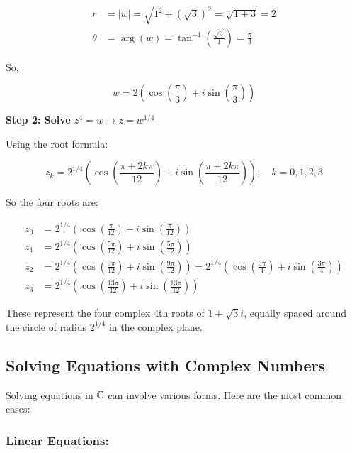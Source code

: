 \begin{align*}
	r      & = |w| = \sqrt{1^2 + {(\sqrt{3})}^2} = \sqrt{1 + 3} = 2                    \\
	\theta & = \arg(w) = \tan^{-1} \left( \frac{\sqrt{3}}{1} \right) = \frac{\pi}{3}
\end{align*}

So,

\[
	w = 2 \left( \cos\left( \frac{\pi}{3} \right) + i \sin\left( \frac{\pi}{3} \right) \right)
\]

\textbf{Step 2: Solve \( z^4 = w \to z = w^{1/4} \)}

Using the root formula:

\[
	z_k = 2^{1/4} \left( \cos\left( \frac{\pi + 2k\pi}{12} \right) + i \sin\left( \frac{\pi + 2k\pi}{12} 
	\right) \right), \quad k = 0, 1, 2, 3
\]

So the four roots are:

\begin{align*}
	z_0 & = 2^{1/4} \left( \cos\left( \frac{\pi}{12} \right) + i \sin\left( \frac{\pi}{12} \right) \right)                                                                                                    \\
	z_1 & = 2^{1/4} \left( \cos\left( \frac{5\pi}{12} \right) + i \sin\left( \frac{5\pi}{12} \right) \right)                                                                                                  \\
	z_2 & = 2^{1/4} \left( \cos\left( \frac{9\pi}{12} \right) + i \sin\left( \frac{9\pi}{12} \right) \right) = 2^{1/4} \left( \cos\left( \frac{3\pi}{4} \right) + i \sin\left( \frac{3\pi}{4} \right) \right) \\
	z_3 & = 2^{1/4} \left( \cos\left( \frac{13\pi}{12} \right) + i \sin\left( \frac{13\pi}{12} \right) \right)
\end{align*}

These represent the four complex 4th roots of \( 1 + \sqrt{3}i \), equally spaced around the circle of 
radius \( 2^{1/4} \) in the complex plane.

\subsection{Solving Equations with Complex Numbers}

Solving equations in \( \mathbb{C} \) can involve various forms. Here are the most common cases:

\subsubsection{Linear Equations:}

